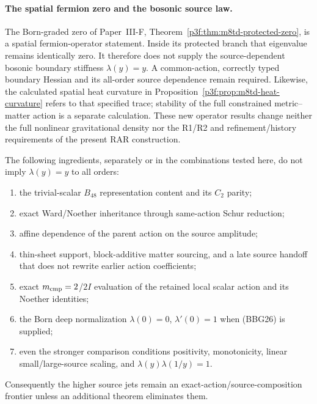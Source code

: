 \documentclass[12pt,a4paper]{article}
\begin{document}
\paragraph{The spatial fermion zero and the bosonic source law.}
\label{p8:par:m8td-fermion-boson-boundary}
The Born-graded zero of Paper~III-F,
Theorem~\ref{p3f:thm:m8td-protected-zero}, is a spatial fermion-operator
statement. Inside its protected branch that eigenvalue remains identically
zero. It therefore does not supply the source-dependent bosonic boundary
stiffness $\lambda(y)=y$. A common-action, correctly typed boundary
Hessian and its all-order source dependence remain required. Likewise,
the calculated spatial heat curvature in
Proposition~\ref{p3f:prop:m8td-heat-curvature} refers to that specified
trace; stability of the full constrained metric--matter action is a
separate calculation. These new operator results change neither the
full nonlinear gravitational density nor the R1/R2 and refinement/history
requirements of the present RAR construction.

\begin{proposition}
\label{p8:prop:v260-g26-audited-basis-nogo}
The following ingredients, separately or in the combinations tested here, do
not imply \(\lambda(y)=y\) to all orders:
\begin{enumerate}
 \item the trivial-scalar \(B_{48}\) representation content and its \(C_2\)
 parity;
 \item exact Ward/Noether inheritance through same-action Schur reduction;
 \item affine dependence of the parent action on the source amplitude;
 \item thin-sheet support, block-additive matter sourcing, and a late source
 handoff that does not rewrite earlier action coefficients;
 \item exact \(m_{\rm cmp}=2\)/\(2I\) evaluation of the retained local scalar
 action and its Noether identities;
 \item the Born deep normalization
 \(\lambda(0)=0\), \(\lambda'(0)=1\) when (BBG26) is supplied;
 \item even the stronger comparison conditions positivity, monotonicity,
 linear small/large-source scaling, and
 \(\lambda(y)\lambda(1/y)=1\).
\end{enumerate}
Consequently the higher source jets remain an exact-action/source-composition
frontier unless an additional theorem eliminates them.
\end{proposition}
\end{document}
